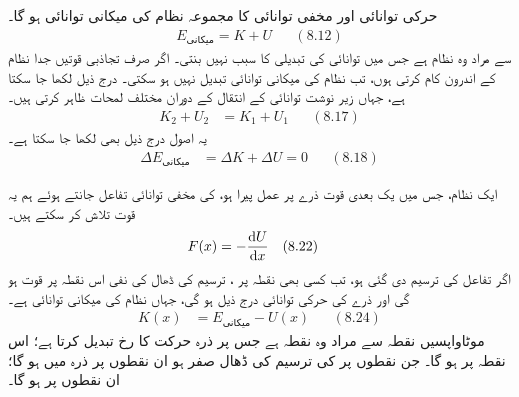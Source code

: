 حرکی توانائی  اور مخفی توانائی  کا مجموعہ نظام کی میکانی توانائی  ہو گا۔
\begin{align*}
E_{\text{میکانی}}=K+U && (8.12)
\end{align*}
سے مراد وہ نظام ہے جس میں توانائی کی تبدیلی کا سبب نہیں بنتی۔ اگر صرف تجاذبی قوتیں جدا نظام کے  اندرون  کام کرتی ہوں، تب نظام کی میکانی توانائی  تبدیل نہیں  ہو سکتی۔ درج ذیل لکھا جا سکتا ہے، جہاں زیر نوشت  توانائی کے انتقال  کے دوران  مختلف   لمحات ظاہر کرتی ہیں۔
\begin{align*}
K_2+U_2&=K_1+U_1 && (8.17)
\end{align*}
یہ اصول درج ذیل بھی لکھا جا سکتا ہے۔
\begin{align*}
\Delta E_{\text{میکانی}}&=\Delta K+\Delta U=0 && (8.18)
\end{align*}

ایک نظام،  جس میں یک بعدی  قوت   ذرے پر  عمل پیرا ہو، کی مخفی توانائی تفاعل  جانتے ہوئے ہم یہ قوت تلاش کر سکتے ہیں۔
\begin{align*}
F(x)&=-\frac{\dif U}{\dif x}&&(8.22)
\end{align*}
اگر تفاعل   کی ترسیم دی گئی ہو، تب کسی بھی  نقطہ  پر ، ترسیم کی  ڈھال  کی   نفی  اس نقطہ پر  قوت  ہو گی اور  ذرے کی حرکی توانائی درج ذیل ہو گی،  جہاں  نظام  کی میکانی توانائی ہے۔
\begin{align*}
K(x)&=E_{\text{میکانی}}-U(x)&&(8.24)
\end{align*}
موٹا{واپسیں نقطہ } سے مراد وہ نقطہ ہے جس پر ذرہ  حرکت کا رخ تبدیل کرتا ہے؛ اس نقطہ پر  ہو گا۔ جن نقطوں پر  کی ترسیم  کی ڈھال صفر ہو ان نقطوں پر ذرہ میں ہو گا؛ ان نقطوں پر  ہو گا۔

